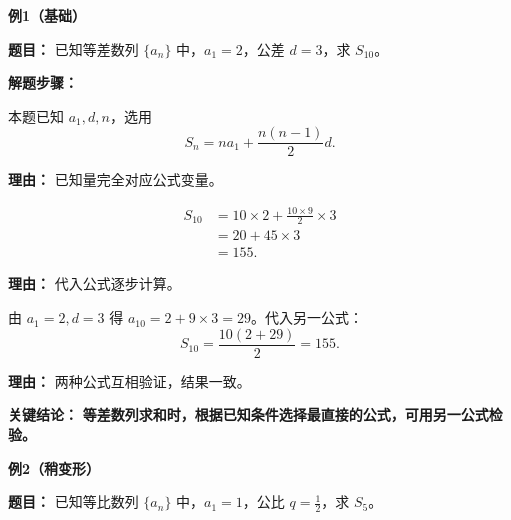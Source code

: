 \begin{examplebox}
	\textbf{\textcolor{CExample}{例1（基础）}}

	\textbf{\textcolor{CExample}{题目：}}
	已知等差数列 \(\{a_n\}\) 中，\(a_1=2\)，公差 \(d=3\)，求 \(S_{10}\)。

	\textbf{\textcolor{CExample}{解题步骤：}}
	\begin{description}[style=nextline, leftmargin=2.8em, labelsep=0.5em, itemsep=0.45em]
		\item[\textbf{第一步（识别公式）：}]
		      本题已知 \(a_1,d,n\)，选用
		      \[
			      S_n=na_1+\frac{n(n-1)}{2}d.
		      \]
		      \par\textbf{理由：} 已知量完全对应公式变量。
		\item[\textbf{第二步（代入数值）：}]
		      \[
			      \begin{aligned}
				      S_{10}
				       & =10\times2+\frac{10\times9}{2}\times3 \\
				       & =20+45\times3                         \\
				       & =155.
			      \end{aligned}
		      \]
		      \par\textbf{理由：} 代入公式逐步计算。
		\item[\textbf{第三步（验证结论）：}]
		      由 \(a_1=2,d=3\) 得 \(a_{10}=2+9\times3=29\)。代入另一公式：
		      \[
			      S_{10}=\frac{10(2+29)}{2}=155.
		      \]
		      \par\textbf{理由：} 两种公式互相验证，结果一致。
	\end{description}

	\textbf{\textcolor{CExample}{关键结论：}}
	\textbf{等差数列求和时，根据已知条件选择最直接的公式，可用另一公式检验。}

	\medskip
	\textbf{\textcolor{CExample}{例2（稍变形）}}

	\textbf{\textcolor{CExample}{题目：}}
	已知等比数列 \(\{a_n\}\) 中，\(a_1=1\)，公比 \(q=\frac12\)，求 \(S_5\)。


\end{examplebox}
